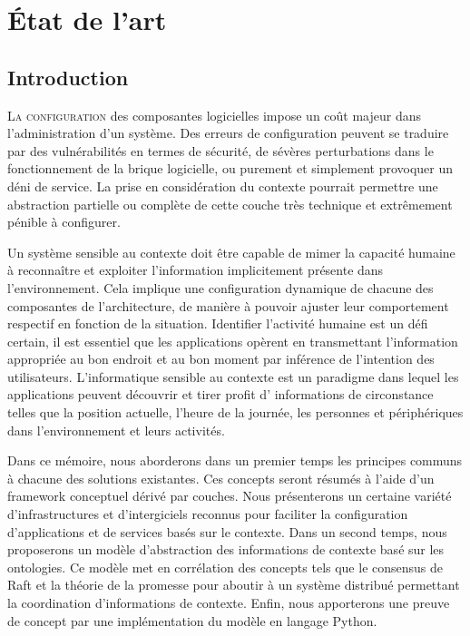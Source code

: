 \chapter{État de l'art}

\section{Introduction}

\lettrine{L}{a configuration} des composantes logicielles impose un coût majeur
dans l'administration d'un système. Des erreurs de configuration peuvent se
traduire par des vulnérabilités en termes de sécurité, de sévères perturbations
dans le fonctionnement de la brique logicielle, ou purement et simplement
provoquer un déni de service. La prise en considération du contexte pourrait
permettre une abstraction partielle ou complète de cette couche très technique
et extrêmement pénible à configurer.

Un système sensible au contexte doit être capable de mimer la capacité humaine à
reconnaître et exploiter l'information implicitement présente dans
l'environnement. Cela implique une configuration dynamique de chacune des
composantes de l'architecture, de manière à pouvoir ajuster leur comportement
respectif en fonction de la situation. Identifier l'activité humaine est un
défi certain, il est essentiel que les applications opèrent en transmettant
l'information appropriée au bon endroit et au bon moment par inférence de
l'intention des utilisateurs. L'informatique sensible au contexte est un
paradigme dans lequel les applications peuvent découvrir et tirer profit d'
informations de circonstance telles que la position actuelle, l'heure de la
journée, les personnes et périphériques dans l'environnement et leurs activités.

Dans ce mémoire, nous aborderons dans un premier temps les principes communs à
chacune des solutions existantes. Ces concepts seront résumés à l'aide d'un
framework conceptuel dérivé par couches. Nous présenterons un certaine variété
d'infrastructures et d'intergiciels reconnus pour faciliter la configuration
d'applications et de services basés sur le contexte. Dans un second temps, nous
proposerons un modèle d'abstraction des informations de contexte basé sur les
ontologies. Ce modèle met en corrélation des concepts tels que le consensus de
Raft et la théorie de la promesse pour aboutir à un système distribué permettant
la coordination d'informations de contexte. Enfin, nous apporterons une preuve de
concept par une implémentation du modèle en langage Python.

